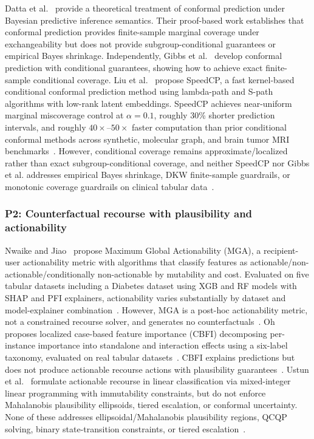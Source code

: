 \documentclass[11pt,a4paper]{article}
\theoremstyle{plain}
\begin{document}
Datta et al.~\cite{datta2025conformal} provide a theoretical treatment of conformal prediction under Bayesian predictive inference semantics. Their proof-based work establishes that conformal prediction provides finite-sample marginal coverage under exchangeability but does not provide subgroup-conditional guarantees or empirical Bayes shrinkage. Independently, Gibbs et al.~\cite{gibbs2025conformal} develop conformal prediction with conditional guarantees, showing how to achieve exact finite-sample conditional coverage. Liu et al.~\cite{liu2026speedcp} propose SpeedCP, a fast kernel-based conditional conformal prediction method using lambda-path and S-path algorithms with low-rank latent embeddings. SpeedCP achieves near-uniform marginal miscoverage control at $\alpha{=}0.1$, roughly 30\% shorter prediction intervals, and roughly $40\times$--$50\times$ faster computation than prior conditional conformal methods across synthetic, molecular graph, and brain tumor MRI benchmarks~\cite{liu2026speedcp}. However, conditional coverage remains approximate/localized rather than exact subgroup-conditional coverage, and neither SpeedCP nor Gibbs et al. addresses empirical Bayes shrinkage, DKW finite-sample guardrails, or monotonic coverage guardrails on clinical tabular data~\cite{datta2025conformal, gibbs2025conformal, liu2026speedcp}.

\subsubsection{P2: Counterfactual recourse with plausibility and actionability}

Nwaike and Jiao~\cite{kelechi2023mga} propose Maximum Global Actionability (MGA), a recipient-user actionability metric with algorithms that classify features as actionable/non-actionable/conditionally non-actionable by mutability and cost. Evaluated on five tabular datasets including a Diabetes dataset using XGB and RF models with SHAP and PFI explainers, actionability varies substantially by dataset and model-explainer combination~\cite{kelechi2023mga}. However, MGA is a post-hoc actionability metric, not a constrained recourse solver, and generates no counterfactuals~\cite{kelechi2023mga}. Oh~\cite{oh2026cbfi} proposes localized case-based feature importance (CBFI) decomposing per-instance importance into standalone and interaction effects using a six-label taxonomy, evaluated on real tabular datasets~\cite{oh2026cbfi}. CBFI explains predictions but does not produce actionable recourse actions with plausibility guarantees~\cite{oh2026cbfi}. Ustun et al.~\cite{ustun2019actionable} formulate actionable recourse in linear classification via mixed-integer linear programming with immutability constraints, but do not enforce Mahalanobis plausibility ellipsoids, tiered escalation, or conformal uncertainty. None of these addresses ellipsoidal/Mahalanobis plausibility regions, QCQP solving, binary state-transition constraints, or tiered escalation~\cite{oh2026cbfi, kelechi2023mga}.
\end{document}
